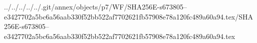 ../../../../../.git/annex/objects/p7/WF/SHA256E-s673805--e3427702a5bc6a56aab330f52bb522af7702621fb57908e78a120fc489a60a94.tex/SHA256E-s673805--e3427702a5bc6a56aab330f52bb522af7702621fb57908e78a120fc489a60a94.tex